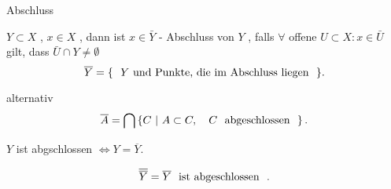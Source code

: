 \documentclass[class=article, crop=false]{standalone}
\begin{document}
\begin{zettel}{Abschluss}
\begin{flashcard}[]{}
	\begin{definition}[Abschluss]
		$Y \subset X$ , $x \in  X$ , dann ist $x \in  \bar{Y} $ - Abschluss von $Y$ , falls  $\forall $ offene $U \subset X : x \in  \bar{U} $ gilt, dass $ \bar{U} \cap Y \neq  \emptyset$
		\[
			\bar{Y} =  \set{ \tx{ $Y$ und Punkte, die im Abschluss liegen } }
		.\]
	\end{definition}
\end{flashcard}

alternativ
\[
	\bar{A} = \bigcap \set{C}{A \subset C,\quad C  \tx{ abgeschlossen } }
.\]
\begin{lemma}
	$Y$ ist abgschlossen $\iff Y =\overline{Y} $.
\end{lemma}

\begin{corollary}
	\[
		\overline{\overline{Y}} = \overline{Y} \tx{ ist abgeschlossen }
	.\]
\end{corollary}
\end{zettel}
\end{document}
